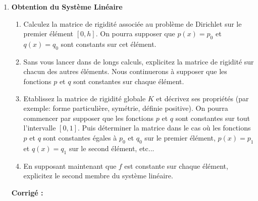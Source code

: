 \documentclass[a4paper,12pt]{article}
\newif\ifcorriges
\newenvironment{solution}
  {
    \ifcorriges
      \begin{framed}
      \par\noindent\textbf{Corrigé :} 
  }
  {
      \end{framed}
    \fi
  }
\begin{document}
\begin{enumerate}
\begin{solution}
\begin{enumerate}
            \item L'espace \( V_h \) est l'espace des fonctions continues et affines par morceaux sur le maillage défini :
            \[
            V_h = \mathop{Vect} \Big( \varphi_0,\, \varphi_1,\, \varphi_2,\, \varphi_3,\, \varphi_4 \Big).
            \]
            \item La solution approchée \( u_h \) s'exprime comme une combinaison linéaire des fonctions de base :
            \[
            u_h = \sum_{i=0}^{4} \alpha_i \varphi_i
            \]
            où les \( \alpha_i \) sont les coefficients inconnus à déterminer.
        \end{enumerate}
        \end{solution}
        \fi
    \item \textbf{Obtention du Système Linéaire}
    \begin{enumerate}
        \item Calculez la matrice de rigidité associée au problème de Dirichlet sur le premier élément $[0,h]$. On pourra supposer que \( p(x)=p_0 \) et \( q(x)=q_0 \) sont constants sur cet élément.
        
        \item Sans vous lancer dans de longs calculs, explicitez la matrice de rigidité sur chacun des autres éléments. Nous continuerons à supposer que les fonctions $p$ et $q$ sont constantes sur chaque élément.

        \item Etablissez la matrice de rigidité globale \( K \) et décrivez ses propriétés (par exemple: forme particulière, symétrie, définie positive). On pourra commencer par supposer que les fonctions $p$ et $q$ sont constantes sur tout l'intervalle $[0,1]$. Puis déterminer la matrice dans le cas où les fonctions $p$ et $q$ sont constantes égales à $p_0$ et $q_0$ sur le premier élément, $p(x)=p_1$ et $q(x)=q_1$ sur le second élément, etc...

        \item En supposant maintenant que $f$ est constante sur chaque élément, explicitez le second membre du système linéaire.

    \end{enumerate}
    
        \ifcorriges
        \begin{solution}


\end{solution}
\end{enumerate}
\end{document}
